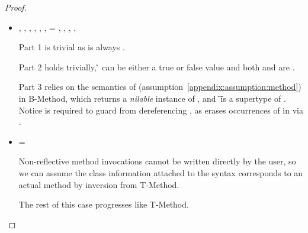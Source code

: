 \begin{lemma}
\begin{proof}
\begin{case}[B-Method]
\begin{itemize}
  \item[]
\begin{subcase}[T-Method]
  \judgementtworewrite {\propenv{}} {\ep{}} {\s{}} {\e{}},
             \issubtypein{}{\s{}}{\Object{}},
  ,
                  ,
                  ,
             ,
  \e{} = { 
                          {} 
                          {}
                          {\mth{}} {} {}},
                        ,
  \inpropenv{\topprop{}}{\thenprop{\prop{}}},
  \inpropenv{\topprop{}}{\elseprop{\prop{}}},
  \issubobjin{}{\emptyobject{}}{\object{}}


Part 1 is trivial as \object{} is always \emptyobject{}.

Part 2 holds trivially, \v{} can be either a true or false value
and both {\thenprop{\prop{}}} and {\elseprop{\prop{}}}
are \topprop{}.

Part 3 relies on the semantics of \invokejavamethodliteral (assumption~\ref{appendix:assumption:method})
in B-Method, which returns a \emph{nilable} instance of ,
and \t{} is a supertype of .
Notice \issubtypein{}{\s{}}{\Object{}} is required to guard from dereferencing \nil{},
as {} erases occurrences of \Nil{} in \s{} via  .
\end{subcase}
\item[]
\begin{subcase}[T-MethodStatic]
  \ep{} = 
  { 
        {} 
        {}
        {\mth{}} {} {}}

  Non-reflective method invocations cannot be written directly by the user, so we can assume
  the class information attached to the syntax corresponds to an actual method by inversion
  from T-Method.

  The rest of this case progresses like T-Method.
\end{subcase}


\end{itemize}


\end{case}
\end{proof}
\end{lemma}
